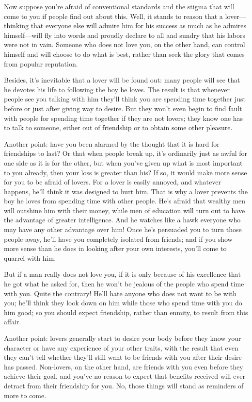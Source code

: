 Now suppose you're afraid of conventional standards and the stigma that
will come to you if people find out about this. Well, it stands to
reason that a lover---thinking that everyone else will admire him for
his success as much as he admires himself---will fly
into words and proudly declare to all and sundry that his labors were
not in vain. Someone who does not love you, on the other hand, can
control himself and will choose to do what is best, rather than seek the
glory that comes from popular reputation.

Besides, it's inevitable that a lover will be found out: many people
will see that he devotes his life to following the boy he loves. The
result is that whenever people see you talking with him they'll
think you are spending time together just before or just after giving
way to desire. But they won't even begin to find fault with people for
spending time together if they are not lovers; they know one has to talk
to someone, either out of friendship or to obtain some other pleasure.

Another point: have you been alarmed by the thought that it is hard for
friendships to last? Or that when people break up, it's ordinarily just 
as awful for one side as it is for the other, but when you've
given up what is most important to you already, then your loss is
greater than his? If so, it would make more sense for you to be afraid
of lovers. For a lover is easily annoyed, and whatever happens, he'll
think it was designed to hurt him. That is why a lover prevents the boy
he loves from spending time with other people. He's afraid that wealthy
men will outshine him with their money, while men of education will turn
out to have the advantage of greater intelligence. And he watches like a
hawk everyone who may have any other advantage over him! Once
he's persuaded you to turn those people away, he'll have you completely
isolated from friends; and if you show more sense than he does in
looking after your own interests, you'll come to quarrel with him.

But if a man really does not love you, if it is only because of his
excellence that he got what he asked for, then he won't be jealous of
the people who spend time with you. Quite the contrary! He'll hate
anyone who does not want to be with you; he'll think they look down on
him while those who spend time with you do him good; so you
should expect friendship, rather than enmity, to result from this
affair.

Another point: lovers generally start to desire your body before they
know your character or have any experience of your other traits, with
the result that even they can't tell whether they'll still want to be
friends with you after their desire has passed.
Non-lovers, on the other hand, are friends with you even before they
achieve their goal, and you've no reason to expect that benefits
received will ever detract from their friendship for you. No, those
things will stand as reminders of more to come.

